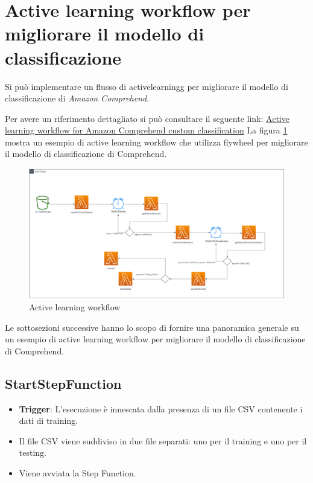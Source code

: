 \section{Active learning workflow per migliorare il modello di classificazione}

Si può implementare un flusso di \gls{activelearningg} per migliorare il modello di classificazione di \emph{Amazon Comprehend}.

Per avere un riferimento dettagliato si può consultare il seguente link: \href{https://aws.amazon.com/it/blogs/machine-learning/active-learning-workflow-for-amazon-comprehend-custom-classification-part-1/}{Active learning workflow for Amazon Comprehend custom classification}
La figura \ref{fig:active_learning_workflow} mostra un esempio di active learning workflow che utilizza flywheel per migliorare il modello di classificazione di Comprehend.
\begin{figure}[htbp]
  \centering
  \includegraphics[width=1\textwidth]{img/active_learning_workflow.png}
  \caption{Active learning workflow}
  \label{fig:active_learning_workflow}
\end{figure}
Le sottosezioni successive hanno lo scopo di fornire una panoramica generale su un esempio di active learning workflow per migliorare il modello di classificazione di Comprehend.
\subsection{StartStepFunction}
\begin{itemize}
  \item \textbf{Trigger}: L'esecuzione è innescata dalla presenza di un file CSV contenente i dati di training.
  \item Il file CSV viene suddiviso in due file separati: uno per il training e uno per il testing.
  \item Viene avviata la Step Function.
\end{itemize}

